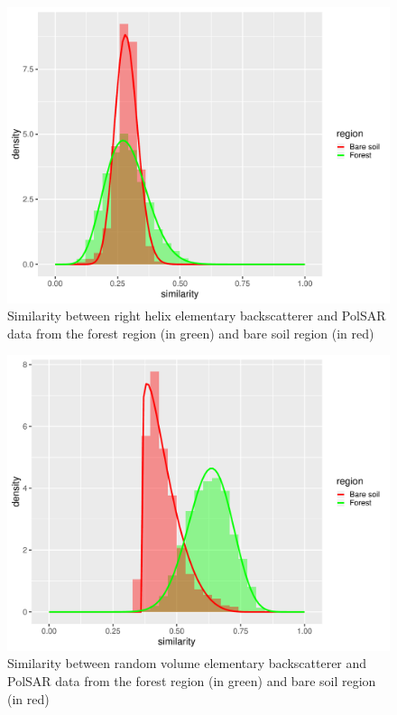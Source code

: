 \documentclass[conference]{IEEEtran}
\begin{document}
\begin{figure}[!ht]
    \centering
    \includegraphics[width = .9\linewidth, height = .7\linewidth]{../../../Figures/paper_19_05/rh.pdf}
    \caption{Similarity between right helix elementary backscatterer and PolSAR data from the forest region (in green) and bare soil region (in red)}
    \label{fig:rh}
\end{figure}

\begin{figure}[!ht]
    \centering
    \includegraphics[width = .9\linewidth, height = .7\linewidth]{../../../Figures/paper_19_05/rv.pdf}
    \caption{Similarity between random volume elementary backscatterer and PolSAR data from the forest region (in green) and bare soil region (in red)}
    \label{fig:rv}
\end{figure}
\end{document}
